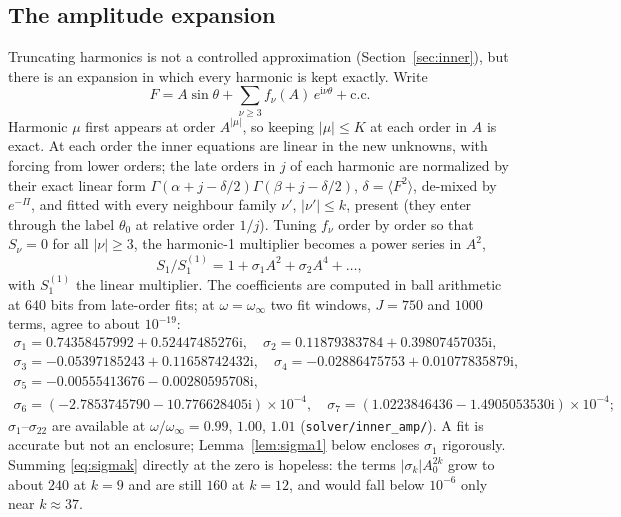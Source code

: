 \documentclass{amsart}
\numberwithin{equation}{section}
\theoremstyle{plain}
\theoremstyle{definition}
\theoremstyle{remark}
\newcommand{\winf}{\omega_\infty}
\newcommand{\iu}{\mathrm{i}}
\newcommand{\repo}[1]{\texttt{#1}}
\begin{document}
\subsection{The amplitude expansion}
\label{sec:amp}
Truncating harmonics is not a controlled approximation (Section~\ref{sec:inner}), but there is an expansion in which every
harmonic is kept exactly. Write
\[
F = A\sin\theta + \sum_{\nu\ge3} f_\nu(A)\,e^{\iu\nu\theta} + \text{c.c.}
\]
Harmonic $\mu$ first appears at order $A^{|\mu|}$, so keeping $|\mu| \le K$ at each order in $A$ is exact. At each order the
inner equations are linear in the new unknowns, with forcing from lower orders; the late orders in $j$ of each harmonic are
normalized by their exact linear form $\Gamma(\alpha + j - \delta/2)\Gamma(\beta + j - \delta/2)$, $\delta = \langle F^2\rangle$, de-mixed
by $e^{-\Pi}$, and fitted with every neighbour family $\nu'$, $|\nu'| \le k$, present (they enter through the label $\theta_0$ at
relative order $1/j$). Tuning $f_\nu$ order by order so that $S_\nu = 0$ for all $|\nu| \ge 3$, the harmonic-1 multiplier becomes
a power series in $A^2$,
\begin{equation}\label{eq:sigmak}
S_1/S_1^{(1)} = 1 + \sigma_1A^2 + \sigma_2A^4 + \dots ,
\end{equation}
with $S_1^{(1)}$ the linear multiplier. The coefficients are computed in ball arithmetic at $640$ bits from late-order fits;
at $\omega = \winf$ two fit windows, $J = 750$ and $1000$ terms, agree to about $10^{-19}$:
\begin{gather*}
\sigma_1 = 0.74358457992 + 0.52447485276\iu,\quad \sigma_2 = 0.11879383784 + 0.39807457035\iu,\\
\sigma_3 = -0.05397185243 + 0.11658742432\iu,\quad \sigma_4 = -0.02886475753 + 0.01077835879\iu,\\
\sigma_5 = -0.00555413676 - 0.00280595708\iu,\\
\sigma_6 = (-2.7853745790 - 10.776628405\iu)\times10^{-4},\quad \sigma_7 = (1.0223846436 - 1.4905053530\iu)\times10^{-4};
\end{gather*}
$\sigma_1$--$\sigma_{22}$ are available at $\omega/\winf = 0.99$, $1.00$, $1.01$ (\repo{solver/inner\_amp/}). A fit is accurate but not an enclosure; Lemma~\ref{lem:sigma1} below encloses $\sigma_1$
rigorously. Summing \eqref{eq:sigmak} directly at the zero is hopeless: the terms $|\sigma_k|A_0^{2k}$ grow to about $240$ at
$k = 9$ and are still $160$ at $k = 12$, and would fall below $10^{-6}$ only near $k \approx 37$.
\end{document}
